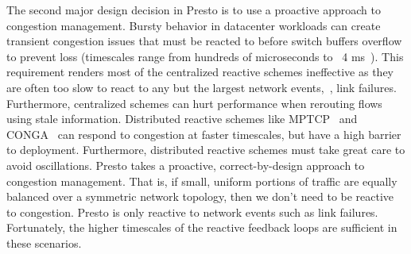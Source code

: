  The second major design decision in 
Presto is to use a proactive approach to congestion management. Bursty 
behavior in datacenter workloads can create transient congestion issues that must be reacted to 
before switch buffers overflow to prevent loss (timescales range from hundreds of microseconds 
to ~4 ms~\cite{planck}). This requirement renders most of the centralized reactive schemes ineffective
as they are often too slow to react to any but the largest network events,~\eg{}, link failures. 
Furthermore, centralized schemes can hurt performance when rerouting
flows using stale information.
Distributed reactive schemes like MPTCP~\cite{mptcp} and 
CONGA~\cite{conga} can respond to congestion at faster timescales, but have a high barrier to deployment.
Furthermore, distributed reactive schemes must take great care to avoid oscillations.
Presto takes a proactive, correct-by-design approach to congestion management. 
That is, if small, uniform portions of traffic are equally
balanced over a symmetric network topology, then we don't need to 
be reactive to congestion.
Presto is only reactive to network events such as link failures. Fortunately, 
the higher timescales of the reactive feedback loops are sufficient in these scenarios. 

